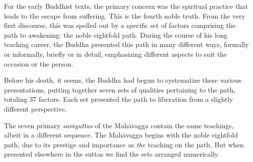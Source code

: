 \documentclass[12pt,openany]{book}%
\begin{document}
For the early Buddhist texts, the primary concern was the spiritual practice that leads to the escape from suffering. This is the fourth noble truth. From the very first discourse, this was spelled out by a specific set of factors comprising the path to awakening: the noble eightfold path. During the course of his long teaching career, the Buddha presented this path in many different ways, formally or informally, briefly or in detail, emphasizing different aspects to suit the occasion or the person.

Before his death, it seems, the Buddha had begun to systematize these various presentations, putting together seven sets of qualities pertaining to the path, totaling 37 factors. Each set presented the path to liberation from a slightly different perspective.

The seven primary \textit{\textsanskrit{saṁyuttas}} of the \textsanskrit{Mahāvagga} contain the same teachings, albeit in a different sequence. The \textsanskrit{Mahāvagga} begins with the noble eightfold path, due to its prestige and importance as \emph{the} teaching on the path. But when presented elsewhere in the suttas we find the sets arranged numerically.
\end{document}
